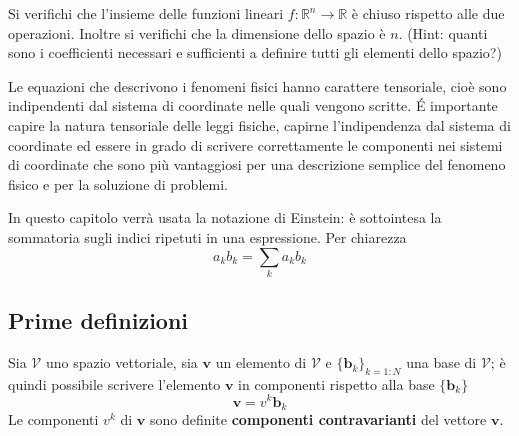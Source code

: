  \begin{esercizio}
  Si verifichi che l'insieme delle funzioni lineari $f: \mathbb{R}^n \rightarrow
  \mathbb{R}$ è chiuso rispetto alle due operazioni. Inoltre si verifichi che la dimensione dello spazio è $n$.
  (Hint: quanti sono i coefficienti necessari e sufficienti a definire tutti gli elementi dello spazio?)
  \end{esercizio}
\newpage

Le equazioni che descrivono i fenomeni fisici hanno carattere tensoriale,
 cioè sono indipendenti dal sistema di coordinate nelle quali vengono scritte.
\'E importante capire la natura tensoriale delle leggi fisiche, capirne
 l'indipendenza dal sistema di coordinate ed essere in grado di scrivere
 correttamente le componenti nei sistemi di coordinate che sono più vantaggiosi
 per una descrizione semplice del fenomeno fisico e per la soluzione di problemi.

\vspace{0.2cm}
In questo capitolo verrà usata la notazione di Einstein: è sottointesa la sommatoria
 sugli indici ripetuti in una espressione. Per chiarezza
\begin{equation}
 a_k b_k = \displaystyle\sum_k a_k b_k
\end{equation}

\subsection{Prime definizioni}

 Sia $\mathcal{V}$ uno spazio vettoriale, sia $\bm{v}$ un elemento di $\mathcal{V}$
 e $\{ \bm{b}_k \}_{k=1:N}$ una base di $\mathcal{V}$; è quindi possibile scrivere
 l'elemento $\bm{v}$ in componenti rispetto alla base $\{ \bm{b}_k \}$
\begin{equation}
  \bm{v} = v^k \bm{b}_k
\end{equation}
 Le componenti $v^k$ di $\bm{v}$ sono definite \textbf{componenti contravarianti} del vettore $\bm{v}$.
 
